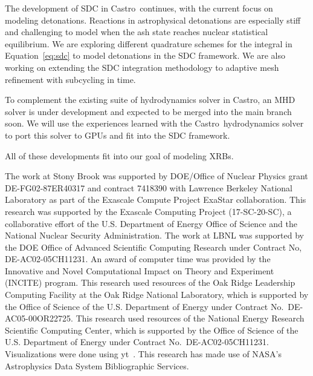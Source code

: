 \documentclass[a4paper]{jpconf}
\newcommand{\castro}{{\sffamily Castro}}
\begin{document}
The development of SDC in \castro\ continues, with the current focus
on modeling detonations.  Reactions in astrophysical detonations are
especially stiff and challenging to model when the ash state reaches
nuclear statistical equilibrium.  We are exploring different
quadrature schemes for the integral in Equation~\ref{eq:sdc} to model
detonations in the SDC framework.  We are also working on extending
the SDC integration methodology to adaptive mesh refinement with
subcycling in time.

To complement the existing suite of hydrodynamics solver in \castro,
an MHD solver is under development and expected to be merged into the
main branch soon.  We will use the experiences learned with the
\castro\ hydrodynamics solver to port this solver to GPUs and fit into
the SDC framework.

All of these developments fit into our goal of modeling XRBs.


\ack The work at Stony Brook was supported by DOE/Office of Nuclear
Physics grant DE-FG02-87ER40317 and contract 7418390 with Lawrence
Berkeley National Laboratory as part of the Exascale Compute Project
ExaStar collaboration.  This research was supported by the Exascale
Computing Project (17-SC-20-SC), a collaborative effort of the
U.S. Department of Energy Office of Science and the National Nuclear
Security Administration.  The work at LBNL was supported by the DOE
Office of Advanced Scientific Computing Research under Contract No,
DE-AC02-05CH11231.  An award of computer time was provided by the
Innovative and Novel Computational Impact on Theory and Experiment
(INCITE) program. This research used resources of the Oak Ridge
Leadership Computing Facility at the Oak Ridge National Laboratory,
which is supported by the Office of Science of the U.S. Department of
Energy under Contract No.\ DE-AC05-00OR22725.  This research used
resources of the National Energy Research Scientific Computing Center,
which is supported by the Office of Science of the U.S. Department of
Energy under Contract No.\ DE-AC02-05CH11231.  Visualizations were
done using yt~\cite{yt}.  This research has made use of NASA's
Astrophysics Data System Bibliographic Services.





\end{document}
